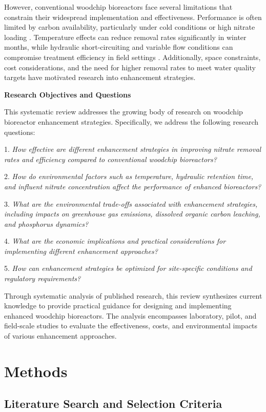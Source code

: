 \documentclass[12pt,a4paper]{article}
\begin{document}
However, conventional woodchip bioreactors face several limitations that constrain their widespread implementation and effectiveness. Performance is often limited by carbon availability, particularly under cold conditions or high nitrate loading \citep{RN625, RN228, RN258}. Temperature effects can reduce removal rates significantly in winter months, while hydraulic short-circuiting and variable flow conditions can compromise treatment efficiency in field settings \citep{RN228, RN309}. Additionally, space constraints, cost considerations, and the need for higher removal rates to meet water quality targets have motivated research into enhancement strategies.

\textbf{Research Objectives and Questions}

This systematic review addresses the growing body of research on woodchip bioreactor enhancement strategies. Specifically, we address the following research questions:

1. \textit{How effective are different enhancement strategies in improving nitrate removal rates and efficiency compared to conventional woodchip bioreactors?}

2. \textit{How do environmental factors such as temperature, hydraulic retention time, and influent nitrate concentration affect the performance of enhanced bioreactors?}

3. \textit{What are the environmental trade-offs associated with enhancement strategies, including impacts on greenhouse gas emissions, dissolved organic carbon leaching, and phosphorus dynamics?}

4. \textit{What are the economic implications and practical considerations for implementing different enhancement approaches?}

5. \textit{How can enhancement strategies be optimized for site-specific conditions and regulatory requirements?}

Through systematic analysis of published research, this review synthesizes current knowledge to provide practical guidance for designing and implementing enhanced woodchip bioreactors. The analysis encompasses laboratory, pilot, and field-scale studies to evaluate the effectiveness, costs, and environmental impacts of various enhancement approaches.

\section{Methods}

\subsection{Literature Search and Selection Criteria}
\end{document}
